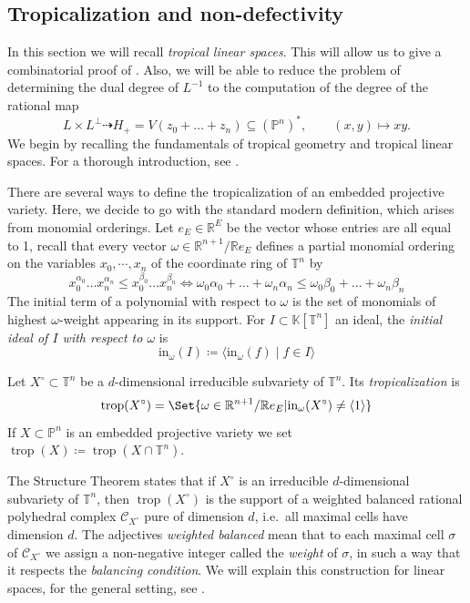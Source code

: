 \documentclass[12pt,a4paper,english]{scrartcl}
\newcommand{\RR}{\mathbb{R}}
\newcommand{\KK}{\mathbb{K}}
\newcommand{\PP}{\mathbb{P}}
\newcommand{\TT}{\mathbb{T}}
\DeclareMathOperator{\trop}{trop}
\begin{document}
\subsection{Tropicalization and non-defectivity}


In this section we will recall \textit{tropical linear spaces}. This will allow us to give a combinatorial proof of . Also, we will be able to reduce the problem of determining the dual degree of $L^{-1}$ to the computation of the degree of the rational map 
\[
L\times L^{\perp} \dashrightarrow H_+= V(z_0+\dots+z_n) \subseteq (\mathbb{P}^n)^*, \qquad (x, y) \mapsto xy.
\]
We begin by recalling the fundamentals of tropical geometry and tropical linear spaces. For a thorough introduction, see \cite{Maclagan2015}.

There are several ways to define the tropicalization of an embedded projective variety. Here, we decide to go with the standard modern definition, which arises from monomial orderings. Let $e_E \in \RR^E$ be the vector whose entries are all equal to 1, recall that
every vector $\omega \in \RR^{n+1}/\RR e_E$ defines a partial monomial ordering on the variables $x_0,\cdots,x_n$ of the coordinate ring of  $\TT^n$ by 
\[
x_0^{\alpha_0}\dots x_n^{\alpha_n} \leq x_0^{\beta_0}\dots x_n^{\beta_n} \iff \omega_0\alpha_0 + \dots + \omega_n\alpha_n \leq\omega_0\beta_0 + \dots + \omega_n\beta_n 
\]
The initial term of a polynomial with respect to $\omega$ is the set of monomials of highest $\omega$-weight appearing in its support.
For $I \subset \KK[\TT^n]$ an ideal,
the \emph{initial ideal of $I$ with respect to $\omega$} is
\[
\text{in}_\omega(I) \coloneq \langle \text{in}_\omega(f) \mid f \in I\rangle
\]

Let $X^\circ \subset \TT^n$ be a $d$-dimensional irreducible subvariety of $\TT^n$. Its \emph{tropicalization} is 
\[
\trop(X^\circ) = \Set{\omega \in \RR^{n+1}/\RR e_E | \text{in}_\omega(X^\circ) \neq \langle 1 \rangle}
\]
If $X \subset \PP^n$ is an embedded projective variety we set $\trop(X) \coloneq \trop(X \cap \TT^n)$.

The Structure Theorem  \cite[Theorem 3.3.5]{Maclagan2015} states that if $X^\circ$ is an irreducible $d$-dimensional subvariety of $\TT^n$, then $\trop(X^\circ)$ is the support of a weighted balanced rational polyhedral complex $\mathcal{C}_{X^\circ}$ pure of dimension $d$, i.e.\ all maximal cells have dimension $d$. The adjectives \emph{weighted balanced} mean that to each maximal cell $\sigma$ of $\mathcal{C}_{X^\circ}$ we assign a non-negative integer called the \emph{weight} of $\sigma$, in such a way that it respects the \emph{balancing condition}. We will explain this construction for linear spaces, for the general setting, see \cite[Section 3.4]{Maclagan2015}.
\end{document}
